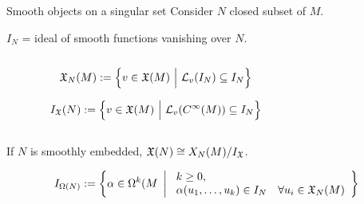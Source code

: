 \documentclass[handout,10pt]{beamer}
\begin{document}
\begin{frame}[shrink]{Smooth objects on a singular set}
	Consider $N$ closed subset of $M$.
	\vfill
	\pause
	\begin{defblock}
	 $I_N$ = ideal of smooth functions vanishing over $N$.
	\end{defblock}
	\vfill
	\pause

	\begin{columns}[T]
		\setlength{\belowdisplayskip}{5pt}
		\begin{column}{.65\linewidth}
			\centering \it
				\begin{defblock}[v.f tangent to $N$]
					\begin{displaymath}
						\mathfrak{X}_N(M):=
						\left\lbrace
							v \in \mathfrak{X}(M)
						~\Big\vert~
							\mathcal{L}_v(I_N) \subseteq I_N
						\right\rbrace
					\end{displaymath}
				\end{defblock}
				\begin{defblock}[v.f vanishing on $N$]
					\begin{displaymath}
						I_{\mathfrak{X}}(N):=
						\left\lbrace
							v \in \mathfrak{X}(M)
						~\Big\vert~
							\mathcal{L}_v(C^\infty(M)) \subseteq I_N
						\right\rbrace
					\end{displaymath}				
				\end{defblock}				
		\end{column}	
		\begin{column}{.35\linewidth}
			\centering 
						
		\end{column}	
	\end{columns}			
	\pause


		\begin{tcolorbox}[
		enhanced,frame hidden,borderline={0.5pt}{0pt}{blue},
		arc=5pt,colback=white,
		colbacktitle=white,]
			 If $N$ is smoothly embedded,  $\mathfrak{X}(N)\cong {X_N(M)}/{I_{\mathfrak{X}}}$.
		\end{tcolorbox}

		\pause

		\begin{defblock}
			\begin{displaymath}
				I_{\Omega(N)}:=
				\left\lbrace
					\alpha\in\Omega^k(M
				~\left\vert~
					\begin{array}{l r}
						k\geq 0,~		\\		
						\alpha(u_1,\ldots,u_k) \in I_N & \forall u_i \in\mathfrak{X}_N(M)
					\end{array}
				\right\rbrace\right.
			\end{displaymath}
		\end{defblock}

\end{frame}
\end{document}
